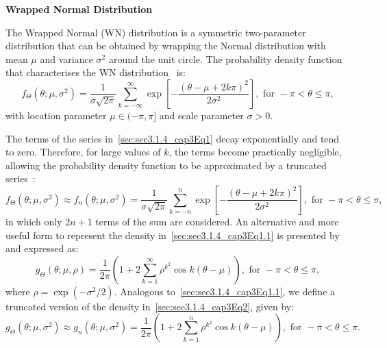 \documentclass[remotesensing,article,submit,pdftex,moreauthors]{Definitions/mdpi}
\providecommand{\subsubsubsection}[1]{%
  \par\bigskip
  \noindent\textbf{#1}\par\nobreak\medskip
}
\begin{document}
\subsubsubsection{Wrapped Normal Distribution}%

The Wrapped Normal (WN) distribution is a symmetric two-parameter distribution that can be obtained by wrapping the Normal distribution with mean $\mu$ and variance $\sigma^2$ around the unit circle. 
The probability density function that characterises the WN distribution~\cite{TopicsinCircularStatistics, CircularStatisticsinR, EfficientEvaluationoftheProbabilityDensityFunctionofaWrappedNormalDistribution} is:
\begin{equation}\label{sec:sec3.1.4_cap3Eq1}
	f_{\Theta}(\theta; \mu, \sigma^2) = \frac{1}{\sigma\sqrt{2\pi}}\sum_{k=-\infty}^{\infty}\exp\left[-\frac{(\theta-\mu+2k\pi)^2}{2\sigma^2}\right], \text{ for }-\pi < \theta \leq \pi,
\end{equation}
with location parameter $\mu \in (-\pi, \pi]$ and scale parameter $\sigma > 0$.

The terms of the series in~\eqref{sec:sec3.1.4_cap3Eq1} decay exponentially and tend to zero. 
Therefore, for large values of $k$, the terms become practically negligible, allowing the probability density function to be approximated by a truncated series~\cite{EfficientEvaluationoftheProbabilityDensityFunctionofaWrappedNormalDistribution}: 
\begin{equation}	f_{\Theta}(\theta; \mu, \sigma^2)
	\approx f_n(\theta; \mu, \sigma^2) 
	=\frac{1}{\sigma\sqrt{2\pi}}\sum_{k=-n}^{n}\exp\left[-\frac{(\theta-\mu+2k\pi)^2}{2\sigma^2}\right], \text{ for }-\pi < \theta \leq \pi, \label{sec:sec3.1.4_cap3Eq1.1}
\end{equation}
in which only $2n + 1$ terms of the sum are considered. An alternative and more useful form to represent the density in~\eqref{sec:sec3.1.4_cap3Eq1.1} is presented by~\cite{CircularStatisticsinR, EfficientEvaluationoftheProbabilityDensityFunctionofaWrappedNormalDistribution} and expressed as:
\begin{equation}\label{sec:sec3.1.4_cap3Eq2}
	g_{\Theta}(\theta; \mu, \rho)=\frac{1}{2\pi}\left(1+2\sum_{k=1}^{\infty}\rho^{k^2}\cos k(\theta-\mu) \right), \text{ for } -\pi < \theta \leq \pi,
\end{equation}
where $\rho = \exp(-\sigma^2/2)$. Analogous to~\eqref{sec:sec3.1.4_cap3Eq1.1}, we define a truncated version of the density in~\eqref{sec:sec3.1.4_cap3Eq2}, given by:
\begin{equation}\label{sec:sec3.1.4_cap3Eq2.1}
	g_{\Theta}(\theta; \mu, \sigma^2)
\approx g_n(\theta; \mu, \sigma^2) = \frac{1}{2\pi}\left(1+2\sum_{k=1}^{n}\rho^{k^2}\cos k(\theta-\mu) \right), \text{ for }-\pi < \theta \leq \pi.
\end{equation}
\end{document}
